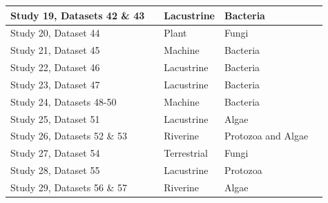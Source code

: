\begin{table}[h]
\begin{tabular}{  l  p{5cm} p{1.5cm}  p{3cm} p{3cm}}
Study 19, Datasets 42 \& 43
&\cite{barberan2011euxinic} 
& Lacustrine
& Bacteria \\\hline
Study 20, Dataset 44
&\cite{peay2007strong} 
& Plant
& Fungi \\\hline
Study 21, Dataset 45
&\cite{van2006bacterial} 
& Machine
& Bacteria \\\hline
Study 22, Dataset 46
&\cite{bell2005larger} 
& Lacustrine
& Bacteria \\\hline
Study 23, Dataset 47
&\cite{reche2005does} 
& Lacustrine
& Bacteria \\\hline
Study 24, Datasets 48-50
&\cite{van2005island} 
& Machine
& Bacteria \\\hline
Study 25, Dataset 51
&\cite{karatayev2005community} 
& Lacustrine
& Algae \\\hline
Study 26, Datasets 52 \& 53
&\cite{mccormick1988comparison} 
& Riverine
& Protozoa and Algae \\\hline
Study 27, Dataset 54
&\cite{wildman1987fungal} 
& Terrestrial
& Fungi \\\hline
Study 28, Dataset 55
&\cite{henebry1980effect} 
& Lacustrine
& Protozoa \\\hline
Study 29, Datasets 56 \& 57
&\cite{patrick1967effect} 
& Riverine
& Algae \\
        \bottomrule
    \end{tabular}
\end{table}


